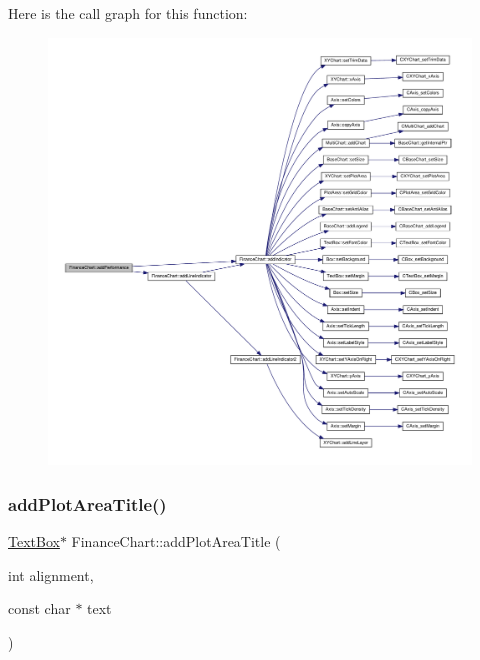 Here is the call graph for this function\+:
\nopagebreak
\begin{figure}[H]
\begin{center}
\leavevmode
\includegraphics[width=350pt]{class_finance_chart_a86b3b47168753b4876b38464ecc5ab33_cgraph}
\end{center}
\end{figure}
\mbox{\label{class_finance_chart_acf483e2850387592ab861effcd443eb6}} 
\subsubsection{\texorpdfstring{add\+Plot\+Area\+Title()}{addPlotAreaTitle()}}
{\footnotesize\ttfamily \hyperlink{class_text_box}{Text\+Box}$\ast$ Finance\+Chart\+::add\+Plot\+Area\+Title (\begin{DoxyParamCaption}\item[{int}]{alignment,  }\item[{const char $\ast$}]{text }\end{DoxyParamCaption})\hspace{0.3cm}{\ttfamily [inline]}}



